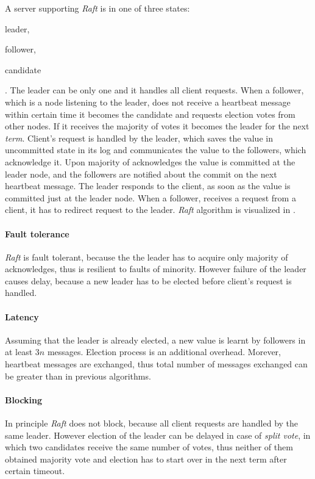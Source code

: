  A server supporting \emph{Raft} is in one of three states: \begin{enumerate*} \item leader, \item follower, \item candidate \end{enumerate*}. The leader can be only one and it handles all client requests.
  When a follower, which is a node listening to the leader, does not receive a heartbeat message within certain time it becomes the candidate and requests election votes from other nodes. If it receives the majority of votes it becomes the leader for the next \emph{term}. Client's request is handled by the leader, which saves the value in uncommitted state in its log and communicates the value to the followers, which acknowledge it. Upon majority of acknowledges the value is committed at the leader node, and the followers are notified about the commit on the next heartbeat message. The leader responds to the client, as soon as the value is committed just at the leader node. When a follower, receives a request from a client, it has to redirect request to the leader. \emph{Raft} algorithm is visualized in \cite{raftVisual}.

\paragraph{Fault tolerance} \emph{Raft} is fault tolerant, because the the leader has to acquire only majority of acknowledges, thus is resilient to faults of minority. However failure of the leader causes delay, because a new leader has to be elected before client's request is handled.

\paragraph{Latency} Assuming that the leader is already elected, a new value is learnt by followers in at least $3n$ messages. Election process is an additional overhead. Morever, heartbeat messages are exchanged, thus total number of messages exchanged can be greater than in previous algorithms.

\paragraph{Blocking} In principle \emph{Raft} does not block, because all client requests are handled by the same leader. However election of the leader can be delayed in case of \emph{split vote}, in which two candidates receive the same number of votes, thus neither of them obtained majority vote and election has to start over in the next term after certain timeout.


